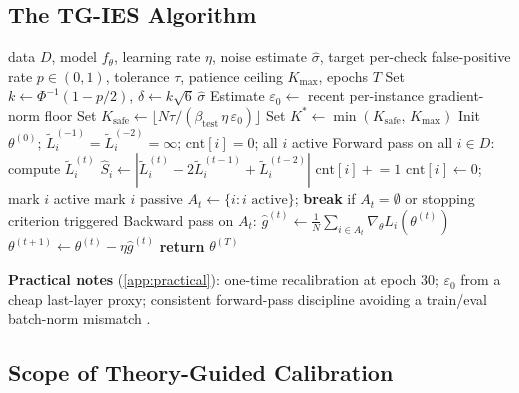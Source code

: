\documentclass{article}
\theoremstyle{plain}
\theoremstyle{definition}
\theoremstyle{remark}
\begin{document}
\subsection{The TG-IES Algorithm}

\begin{algorithm}[t]
\caption{Theory-Guided Instance-Dependent Early Stopping (TG-IES)}
\label{alg:tgies}
\small
\begin{algorithmic}
 data $D$, model $f_\theta$, learning rate $\eta$, noise estimate $\hat\sigma$, target per-check false-positive rate $p\in(0,1)$, tolerance $\tau$, patience ceiling $K_{\max}$, epochs $T$
\STATE Set $k \leftarrow \Phi^{-1}(1-p/2)$, $\delta \leftarrow k\sqrt6\,\hat\sigma$ 
\STATE Estimate $\varepsilon_0 \leftarrow$ recent per-instance gradient-norm floor
\STATE Set $K_{\mathrm{safe}} \leftarrow \lfloor N\tau / (\beta_{\mathrm{test}}\,\eta\,\varepsilon_0) \rfloor$ 
\STATE Set $K^* \leftarrow \min(K_{\mathrm{safe}},\,K_{\max})$ 
\STATE Init $\theta^{(0)}$; $\tilde L_i^{(-1)}=\tilde L_i^{(-2)}=\infty$; $\mathrm{cnt}[i]=0$; all $i$ active
   \STATE Forward pass on all $i\in D$: compute $\tilde L_i^{(t)}$
      \STATE $\hat S_i \leftarrow |\tilde L_i^{(t)} - 2\tilde L_i^{(t-1)} + \tilde L_i^{(t-2)}|$
       \STATE $\mathrm{cnt}[i] \mathrel{+}= 1$ \ELSE \STATE $\mathrm{cnt}[i] \leftarrow 0$; mark $i$ active \ENDIF
       \STATE mark $i$ passive \ENDIF
   \ENDFOR
   \STATE $A_t \leftarrow \{i : i \text{ active}\}$; \textbf{break} if $A_t = \emptyset$ or stopping criterion triggered
   \STATE Backward pass on $A_t$: $\hat g^{(t)} \leftarrow \frac1N\sum_{i\in A_t}\nabla_\theta L_i(\theta^{(t)})$ 
   \STATE $\theta^{(t+1)} \leftarrow \theta^{(t)} - \eta\hat g^{(t)}$
\ENDFOR
\STATE \textbf{return} $\theta^{(T)}$
\end{algorithmic}
\end{algorithm}

\textbf{Practical notes} (\cref{app:practical}): one-time recalibration at epoch 30; $\varepsilon_0$ from a cheap last-layer proxy; consistent forward-pass discipline avoiding a train/eval batch-norm mismatch \citep{ioffe2015batch}.

\subsection{Scope of Theory-Guided Calibration}
\label{sec:selfcalib-scope}
\end{document}

